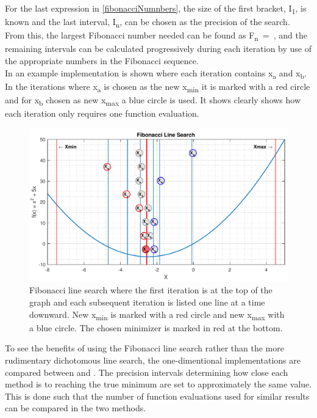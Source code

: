 For the last expression in \eqref{fibonacciNumnbers}, the size of the first bracket, \si{I_1}, is known and the last interval, \si{I_n}, can be chosen as the precision of the search. From this, the largest Fibonacci number needed can be found as \si{F_n = }, and the remaining intervals can be calculated progressively during each iteration by use of the appropriate numbers in the Fibonacci sequence.\\
In  an example implementation is shown where each iteration contains \si{x_a} and \si{x_b}. In the iterations where \si{x_a} is chosen as the new \si{x_{min}} it is marked with a red circle and for \si{x_b} chosen as new \si{x_{max}} a blue circle is used. It shows clearly shows how each iteration only requires one function evaluation.

\begin{figure}[H] 
	\centering
	\includegraphics[width=.8\textwidth]{figures/fibonacciLineSearchComprehension}
	\caption{Fibonacci line search where the first iteration is at the top of the graph and each subsequent iteration is listed one line at a time downward. New \si{x_{min}} is marked with a red circle and new \si{x_{max}} with a blue circle. The chosen minimizer is marked in red at the bottom.}
	\label{fibonacciLineSearchComprehensive}
\end{figure}

To see the benefits of using the Fibonacci line search rather than the more rudimentary dichotomous line search, the one-dimentional implementations are compared between  and . The precision intervals determining how close each method is to reaching the true minimum are set to approximately the same value. This is done such that the number of function evaluations used for similar results can be compared in the two methods.


